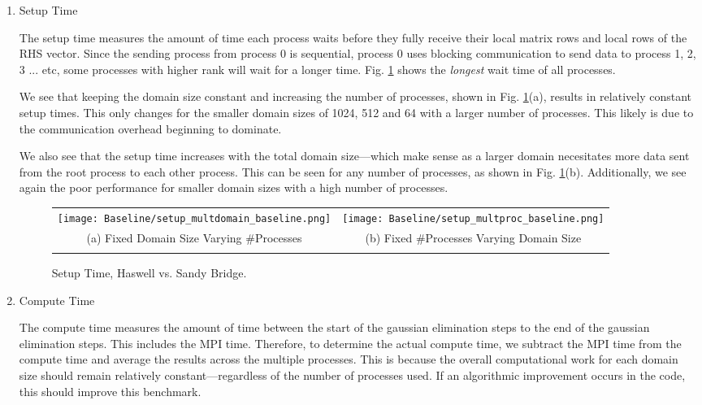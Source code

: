 \begin{enumerate}
\begin{enumerate}
	\item Setup Time

	The setup time measures the amount of time each process waits before they fully receive their local matrix rows and local rows of the RHS vector. Since the sending process from process 0 is sequential, process 0 uses blocking communication to send data to process 1, 2, 3 ... etc, some processes with higher rank will wait for a longer time. Fig. \ref{fig:setup} shows the \textit{longest} wait time of all processes. 
	
	We see that keeping the domain size constant and increasing the number of processes, shown in Fig. \ref{fig:setup}(a), results in relatively constant setup times. This only changes for the smaller domain sizes of 1024, 512 and 64 with a larger number of processes. This likely is due to the communication overhead beginning to dominate.
	
 We also see that the setup time increases with the total domain size---which make sense as a larger domain necesitates more data sent from the root process to each other process. This can be seen for any number of processes, as shown in Fig. \ref{fig:setup}(b). Additionally, we see again the poor performance for smaller domain sizes with a high number of processes.
	
	
	\begin{figure}[h] %
		\hspace*{-0.25\linewidth}\begin{tabular}{cc}
			\texttt{[image: Baseline/setup\_multdomain\_baseline.png]} & \texttt{[image: Baseline/setup\_multproc\_baseline.png]} \\
		    (a) Fixed Domain Size Varying \#Processes & (b) Fixed \#Processes Varying Domain Size\\[6pt]\\
		\end{tabular}
		\caption{Setup Time, Haswell vs. Sandy Bridge.}
		\label{fig:setup}
	\end{figure}
	
	\item Compute Time
	
	The compute time measures the amount of time between the start of the gaussian elimination steps to the end of the gaussian elimination steps. This includes the MPI time. Therefore, to determine the actual compute time, we subtract the MPI time from the compute time and average the results across the multiple processes. This is because the overall computational work for each domain size should remain relatively constant---regardless of the number of processes used. If an algorithmic improvement occurs in the code, this should improve this benchmark.
	

\end{enumerate}
\end{enumerate}
